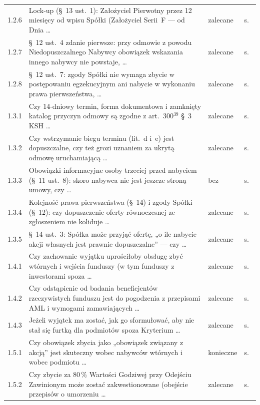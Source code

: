 \documentclass[12pt,a4paper]{report}
\begin{document}
{\begin{longtable}{@{}p{1.2cm} p{9.6cm} p{2.3cm} p{1.4cm}@{}}
1.2.6 & Lock-up (§~13 ust.~1): Założyciel Pierwotny przez 12 miesięcy od wpisu Spółki (Założyciel Serii~F --- od Dnia \ldots & zalecane & s.~\pageref{memo:1.2.6} \\
1.2.7 & §~12 ust.~4 zdanie pierwsze: przy odmowie z powodu Niedopuszczalnego Nabywcy obowiązek wskazania innego nabywcy nie powstaje, \ldots & zalecane & s.~\pageref{memo:1.2.7} \\
1.2.8 & §~12 ust.~7: zgody Spółki nie wymaga zbycie w postępowaniu egzekucyjnym ani nabycie w wykonaniu prawa pierwszeństwa, \ldots & zalecane & s.~\pageref{memo:1.2.8} \\
1.3.1 & Czy 14-dniowy termin, forma dokumentowa i zamknięty katalog przyczyn odmowy są zgodne z art.~300$^{39}$ §~3 KSH \ldots & zalecane & s.~\pageref{memo:1.3.1} \\
1.3.2 & Czy wstrzymanie biegu terminu (lit.~d i~e) jest dopuszczalne, czy też grozi uznaniem za ukrytą odmowę uruchamiającą \ldots & zalecane & s.~\pageref{memo:1.3.2} \\
1.3.3 & Obowiązki informacyjne osoby trzeciej przed nabyciem (§~11 ust.~8): skoro nabywca nie jest jeszcze stroną umowy, czy \ldots & bez & s.~\pageref{memo:1.3.3} \\
1.3.4 & Kolejność prawa pierwszeństwa (§~14) i zgody Spółki (§~12): czy dopuszczenie oferty równoczesnej ze zgłoszeniem nie koliduje \ldots & zalecane & s.~\pageref{memo:1.3.4} \\
1.3.5 & §~14 ust.~3: Spółka może przyjąć ofertę, „o ile nabycie akcji własnych jest prawnie dopuszczalne” --- czy \ldots & zalecane & s.~\pageref{memo:1.3.5} \\
1.4.1 & Czy zachowanie wyjątku uprościłoby obsługę zbyć wtórnych i wejścia funduszy (w tym funduszy z inwestorami spoza \ldots & zalecane & s.~\pageref{memo:1.4.1} \\
1.4.2 & Czy odstąpienie od badania beneficjentów rzeczywistych funduszu jest do pogodzenia z przepisami AML i wymogami zamawiających \ldots & zalecane & s.~\pageref{memo:1.4.2} \\
1.4.3 & Jeżeli wyjątek ma zostać, jak go sformułować, aby nie stał się furtką dla podmiotów spoza Kryterium \ldots & zalecane & s.~\pageref{memo:1.4.3} \\
1.5.1 & Czy obowiązek zbycia jako „obowiązek związany z akcją” jest skuteczny wobec nabywców wtórnych i wobec podmiotu \ldots & konieczne & s.~\pageref{memo:1.5.1} \\
1.5.2 & Czy zbycie za 80\,\% Wartości Godziwej przy Odejściu Zawinionym może zostać zakwestionowane (obejście przepisów o umorzeniu \ldots & zalecane & s.~\pageref{memo:1.5.2} \\

\end{longtable}}
\end{document}
